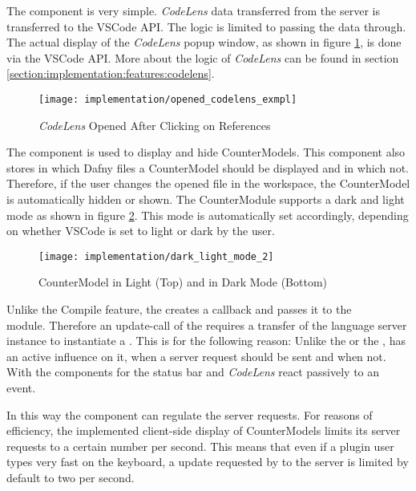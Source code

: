 The  component is very simple. \textit{CodeLens} data transferred from the server is transferred to the VSCode API.
The logic is limited to passing the data through. The actual display of the \textit{CodeLens} popup window,
as shown in figure \ref{fig:opened_codelens_exmpl},
is done via the VSCode API.
More about the logic of \textit{CodeLens} can be found in section \ref{section:implementation:features:codelens}.

\begin{figure}[H]
    \centering
    \texttt{[image: implementation/opened\_codelens\_exmpl]}
    \caption{\textit{CodeLens} Opened After Clicking on References}
    \label{fig:opened_codelens_exmpl}
\end{figure}

The  component is used to display and hide CounterModels.
This component also stores in which Dafny files a CounterModel should be displayed and in which not.
Therefore, if the user changes the opened file in the workspace, the CounterModel is automatically hidden or shown.
The CounterModule supports a dark and light mode as shown in figure \ref{fig:dark_light_mode_2}.
This mode is automatically set accordingly,
depending on whether VSCode is set to light or dark by the user.

\begin{figure}[H]
    \centering
    \texttt{[image: implementation/dark\_light\_mode\_2]}
    \caption{CounterModel in Light (Top) and in Dark Mode (Bottom)}
    \label{fig:dark_light_mode_2}
\end{figure}

Unlike the Compile feature, the  creates a callback and passes it to the \\
 module.
Therefore an update-call of the  requires a transfer of the language server instance to instantiate a .
This is for the following reason: Unlike the  or the ,
 has an active influence on it,
when a server request should be sent and when not.
With the components for the status bar and \textit{CodeLens} react passively to an event.

In this way the  component can regulate the server requests.
For reasons of efficiency, the implemented client-side display of CounterModels limits its
server requests to a certain number per second.
This means that even if a plugin user types very fast on the keyboard, a
update requested by  to the server is limited by default to two per second. \\

